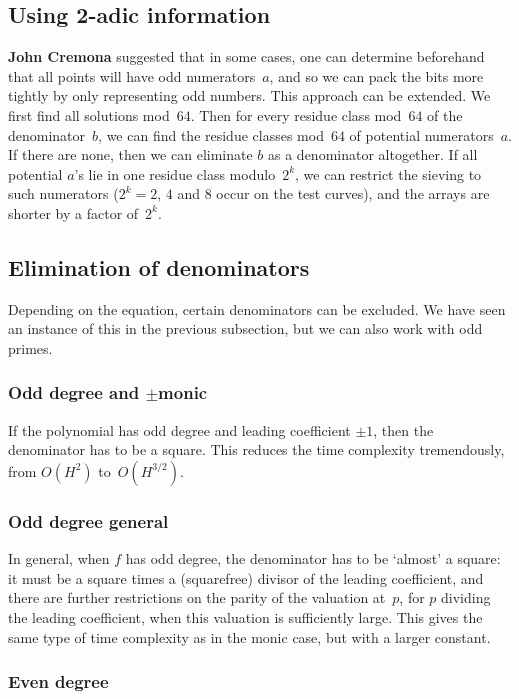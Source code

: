 \documentclass[12pt,a4paper,oneside]{amsart}
\begin{document}
\subsection{Using 2-adic information}

\textbf{John Cremona} suggested that in some cases, one can determine beforehand
that all points will have odd numerators~$a$, and so we can pack the
bits more tightly by only representing odd numbers. This approach can be
extended. We first find all solutions mod~$64$. Then for every
residue class mod~$64$ of the denominator~$b$, we can find the residue
classes mod~$64$ of potential numerators~$a$. If there are none, then we
can eliminate $b$ as a denominator altogether. If all potential $a$'s lie
in one residue class modulo~$2^k$, we can restrict the sieving to such numerators
($2^k = 2$, $4$ and $8$ occur on the test curves), and the arrays
are shorter by a factor of~$2^k$.

\subsection{Elimination of denominators}

Depending on the equation, certain denominators can be excluded. We have
seen an instance of this in the previous subsection, but we can also work
with odd primes.

\subsubsection{Odd degree and $\pm$monic}

If the polynomial has odd degree and leading coefficient $\pm 1$, then
the denominator has to be a square. This reduces the time complexity
tremendously, from $O(H^2)$ to~$O(H^{3/2})$.

\subsubsection{Odd degree general}

In general, when $f$ has odd degree, the denominator has to be `almost'
a square: it must be a square times a (squarefree) divisor of the leading
coefficient, and there are further restrictions on the parity of the
valuation at~$p$, for $p$ dividing the leading coefficient, when this
valuation is sufficiently large. This gives the same type of time complexity
as in the monic case, but with a larger constant.

\subsubsection{Even degree} \label{sec:elim}
\end{document}

